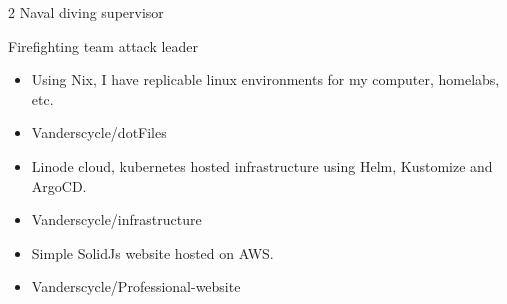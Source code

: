 \documentclass[10pt,a4paper,ragged2e,withhyper]{altacv}
\begin{document}
\begin{paracol}{2}
\cvachievements{\faCertificate}
Naval diving supervisor

\cvachievements{\faCertificate}
Firefighting team attack leader


\begin{itemize}
\item Using Nix, I have replicable linux environments for my computer, homelabs, etc.
\item \faGithub Vanderscycle/dotFiles
\end{itemize}

\begin{itemize}
\item Linode cloud, kubernetes hosted infrastructure using Helm, Kustomize and
  ArgoCD.
\item \faGithub Vanderscycle/infrastructure
\end{itemize}

\begin{itemize}
\item Simple SolidJs website hosted on AWS.
\item \faGithub Vanderscycle/Professional-website
\end{itemize}
\end{paracol}
\end{document}
